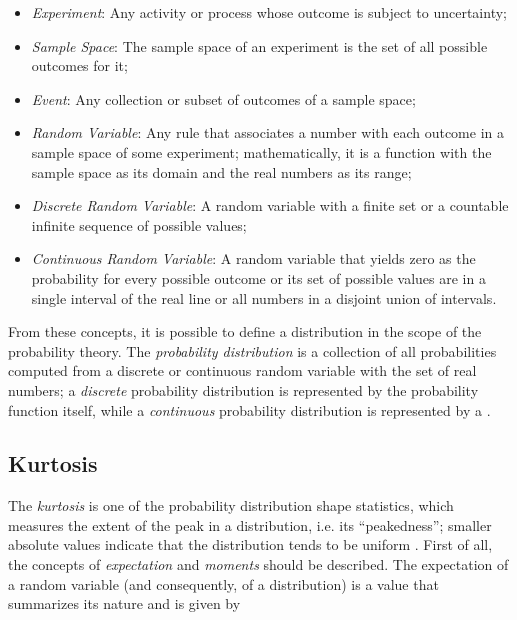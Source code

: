 \begin{itemize}
    \item \emph{Experiment}: Any activity or process whose outcome is subject to uncertainty;
    
    \item \emph{Sample Space}: The sample space of an experiment is the set of all possible outcomes for it;
    
    \item \emph{Event}: Any collection or subset of outcomes of a sample space;
    
    \item \emph{Random Variable}: Any rule that associates a number with each outcome in a sample space of some experiment; mathematically, it is a function with the sample space as its domain and the real numbers as its range;
    
    \item \emph{Discrete Random Variable}: A random variable with a finite set or a countable infinite sequence of possible values;
    
    \item \emph{Continuous Random Variable}: A random variable that yields zero as the probability for every possible outcome or its set of possible values are in a single interval of the real line or all numbers in a disjoint union of intervals.
    
\end{itemize}

From these concepts, it is possible to define a distribution in the scope of the probability theory. The \emph{probability distribution} is a collection of all probabilities computed from a  discrete or continuous random variable with the set of real numbers; a \emph{discrete} probability distribution is represented by the probability function itself, while a \emph{continuous} probability distribution is represented by a  \cite{mendenhall2016statistics}.

\subsection{Kurtosis}

The \emph{kurtosis} is one of the probability distribution shape statistics, which measures the extent of the peak in a distribution, i.e. its ``peakedness''; smaller absolute values indicate that the distribution tends to be uniform \cite{zwillinger1999crc}. First of all, the concepts of \emph{expectation} and \emph{moments} should be described. The expectation of a random variable (and consequently, of a distribution) is a value that summarizes its nature and is given by


